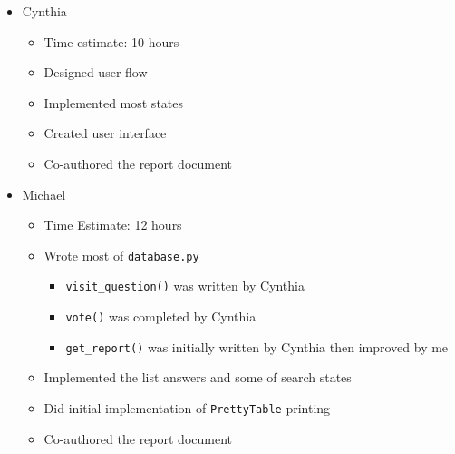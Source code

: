 \documentclass{article}
\begin{document}
\begin{itemize}
    \item Cynthia
          \begin{itemize}
              \item Time estimate: 10 hours
              \item Designed user flow
              \item Implemented most states
              \item Created user interface
              \item Co-authored the report document
          \end{itemize}
    \item Michael
          \begin{itemize}
              \item Time Estimate: 12 hours
              \item Wrote most of \verb|database.py|
                    \begin{itemize}
                        \item \verb|visit_question()| was written by Cynthia
                        \item \verb|vote()| was completed by Cynthia
                        \item \verb|get_report()| was initially written by Cynthia then improved by me
                    \end{itemize}
              \item Implemented the list answers and some of search states
              \item Did initial implementation of \verb|PrettyTable| printing
              \item Co-authored the report document
          \end{itemize}
\end{itemize}
\end{document}
